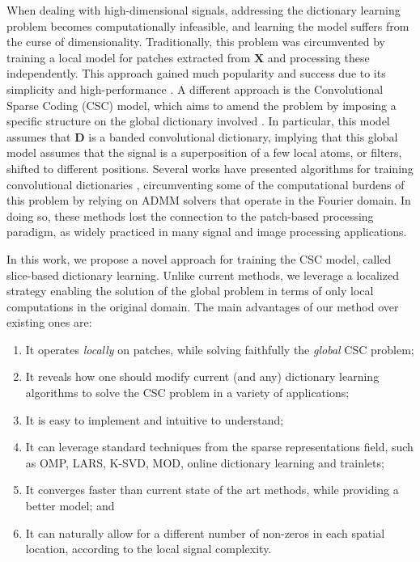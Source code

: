 \documentclass[10pt,twocolumn,letterpaper]{article}
\def\X{{\mathbf X}}
\def\D{{\mathbf D}}
\begin{document}
When dealing with high-dimensional signals, addressing the  dictionary learning problem becomes computationally infeasible, and learning the model suffers from the curse of dimensionality. Traditionally, this problem was circumvented by training a local model for patches extracted from $\X$ and processing these independently. This approach gained much popularity and success due to its simplicity and high-performance \cite{elad2006image,mairal2008sparse,yang2010image,Dong2011,mairal2014sparse}. A different approach is the Convolutional Sparse Coding (CSC) model, which aims to amend the problem by imposing a specific structure on the global dictionary involved \cite{Grosse2007, Bristow2013, Kong2014, Wohlberg2014, Heide2015, Gu2015}. In particular, this model assumes that $\D$ is a banded convolutional dictionary, implying that this global model assumes that the signal is a superposition of a few local atoms, or filters, shifted to different positions. Several works have presented algorithms for training convolutional dictionaries \cite{Bristow2013, Heide2015, Wohlberg2014}, circumventing some of the computational burdens of this problem by relying on ADMM solvers that operate in the Fourier domain. In doing so, these methods lost the connection to the patch-based processing paradigm, as widely practiced in many signal and image processing applications.

In this work, we propose a novel approach for training the CSC model, called slice-based dictionary learning. Unlike current methods, we leverage a localized strategy enabling the solution of the global problem in terms of only local computations in the original domain. The main advantages of our method over existing ones are:
\begin{enumerate}
\item It operates \textit{locally} on patches, while solving faithfully the \textit{global} CSC problem;
\item It reveals how one should modify current (and any) dictionary learning algorithms to solve the CSC problem in a variety of applications;
\item It is easy to implement and intuitive to understand;
\item It can leverage standard techniques from the sparse representations field, such as OMP, LARS, K-SVD, MOD, online dictionary learning and trainlets; 
\item It converges faster than current state of the art methods, while providing a better model; and
\item It can naturally allow for a different number of non-zeros in each spatial location, according to the local signal complexity.
\end{enumerate}
\end{document}
